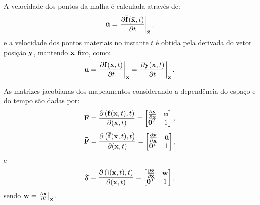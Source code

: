 A velocidade dos pontos da malha é calculada através de:
\begin{align}
	\bar{\mathbf{u}} = \left. \frac{\partial \mathbf{\bar{f}}(\bar{\mathbf{x}},t)}{\partial t} \right|_{\bar{\mathbf{x}}},
\end{align}
\noindent e a velocidade dos pontos materiais no instante $t$ é obtida pela derivada do vetor posição $\mathbf{y}$, mantendo $\mathbf{x}$ fixo, como:
\begin{align}
	\mathbf{u} = \left. \frac{\partial \mathbf{f}(\mathbf{x},t)}{\partial t} \right|_{\mathbf{x}} = \left. \frac{\partial \mathbf{y}(\mathbf{x},t)}{\partial t} \right|_{\mathbf{x}}.
\end{align}

As matrizes jacobianas dos mapeamentos considerando a dependência do espaço e do tempo são dadas por:
\begin{equation} 
	\mathbf{F} = \frac{\partial \left(\mathbf{f}(\mathbf{x},t),t\right)}{\partial (\mathbf{x},t)}=
	\begin{bmatrix}
		\frac{\partial {\mathbf{y}}}{\partial {\mathbf{x}}} & \mathbf{u} \\
		\mathbf{0}^T & 1 \\
	\end{bmatrix}
	\text{,}
\end{equation}
\begin{equation} 
	\mathbf{\bar{F}} = \frac{\partial \left(\mathbf{\bar{f}}(\bar{\mathbf{x}},t),t\right)}{\partial (\bar{\mathbf{x}},t)}=
	\begin{bmatrix}
		\frac{\partial {\mathbf{y}}}{\partial {\bar{\mathbf{x}}}} & \bar{\mathbf{u}} \\
		\mathbf{0}^T & 1 \\
	\end{bmatrix}
	\text{,}
\end{equation}
\noindent e
\begin{equation}
	\mathfrak{F} = \frac{\partial \left({\mathfrak{f}}(\mathbf{x},t),t\right)}{\partial (\mathbf{x},t)}=
	\begin{bmatrix}
		\frac{\partial {\bar{\mathbf{x}}}}{\partial {\mathbf{x}}} & \mathbf{w} \\
		\mathbf{0}^T & 1 \\
	\end{bmatrix}
	\text{,}
\end{equation}
\noindent sendo $\mathbf{w} = \left. \frac{\partial \bar{\mathbf{x}}}{\partial t} \right|_{\mathbf{x}}$.

